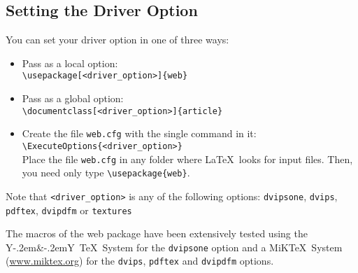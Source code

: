 \documentclass{article}
\def\Y&Y{Y\kern-.2em{\footnotesize\&}\kern-.2emY}
\begin{document}
\subsection{Setting the Driver Option}\label{sss:driver}

You can set your driver option in one of three ways:
\begin{itemize}
  \item Pass as a local option:\\ %
        \verb+\usepackage[<driver_option>]{web}+
  \item Pass as a global option:\\ %
        \verb+\documentclass[<driver_option>]{article}+
  \item Create the file \texttt{web.cfg} with the single command
       in it:\\ %
       \verb+\ExecuteOptions{<driver_option>}+\\
       Place the file \texttt{web.cfg} in any folder where \LaTeX\
       looks for input files.  Then, you need only type
       \verb+\usepackage{web}+.
\end{itemize}
Note that \texttt{<driver\_option>} is any of the following options:
\texttt{dvipsone}, \texttt{dvips}, \texttt{pdftex}, \texttt{dvipdfm}
or \texttt{textures}

The macros of the \textsf{web} package have been extensively
tested using the \Y&Y\ \TeX\ System for the
\texttt{dvipsone} option and a MiK\TeX\ System
(\url{www.miktex.org}) for the \texttt{dvips}, \texttt{pdftex}
and \texttt{dvipdfm} options.
\end{document}
